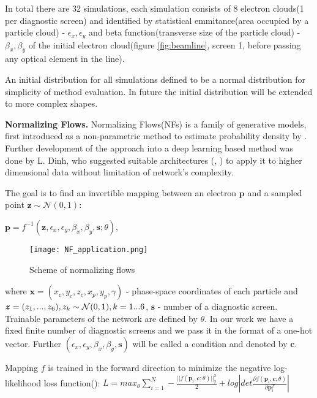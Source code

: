 \documentclass{article}
\begin{document}
In total there are 32 simulations, each simulation consists of 8 electron clouds(1 per diagnostic screen) and identified by statistical emmitance(area occupied by a particle cloud) - $\epsilon_x, \epsilon_y$ and beta function(transverse size of the particle cloud) - $\beta_x, \beta_y$ of the initial electron cloud(figure \ref{fig:beamline}, screen 1, before passing any optical element in the line).

An initial distribution for all simulations defined to be a normal distribution for simplicity of method evaluation.
In future the initial distribution will be extended to more complex shapes.

\textbf{Normalizing Flows.}\label{nfs}
Normalizing Flows(NFs) is a family of generative models, first introduced as a non-parametric method to estimate probability density by \citet{tabak1}. 
Further development of the approach into a deep learning based method was done by L. Dinh, who suggested suitable architectures (\citet{dinhnice}, \citet{dinhrealnvp}) to apply it to higher dimensional data without limitation of network's complexity. 



The goal is to find an invertible mapping between an electron $\bm{p}$ and a sampled point $\bm{z} \sim \mathcal{N}(0, 1)$: 


$\bm{p}=f^{-1}(\bm{z}, \epsilon_x, \epsilon_y, \beta_x, \beta_y, \bm{s}; \theta)$,

\begin{wrapfigure}[5]{r}{5.5cm}
    \begin{center}
    \vspace*{-12mm}
    \texttt{[image: NF\_application.png]}
    \caption{Scheme of normalizing flows}
    \label{fig:nf_appl}
    \end{center}
\end{wrapfigure}

where $\bm{x}=(x_c,y_c,z_c,x_p,y_p,\gamma)$ - phase-space coordinates of each particle 
and $\bm{z}=(z_1, ..., z_6), z_k \sim \mathcal{N}(0, 1), \\ k=1...6$,
$\bm{s}$ - number of a diagnostic screen.
Trainable parameters of the network are defined by $\theta$.
In our work we have a fixed finite number of diagnostic screens and we pass it in the format of a one-hot vector. 
Further $(\epsilon_x, \epsilon_y, \beta_x, \beta_y, \bm{s})$ will be called a condition and denoted by $\bm{c}$. 

Mapping $f$ is trained in the forward direction to minimize the
negative log-likelihood loss function(\citet{cinn}):
$L = max_{\theta}\sum_{i=1}^N -\frac{||f(\bm{p}_i, \bm{c};\theta)||^2_2}{2}+log\left |det\frac{\partial f(\bm{p}_i, \bm{c};\theta)}{\partial \bm{p}_i^T} \right |$
\end{document}
